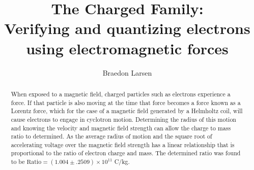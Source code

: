 \documentclass[rc]{physicsinprogress}
\begin{document}
\title{The Charged Family:\\Verifying and quantizing electrons using electromagnetic forces}%

\author{Braedon Larsen}
%


\begin{abstract}
When exposed to a magnetic field, charged particles such as electrons experience a force. If that particle is also moving at the time that force becomes a force known as a Lorentz force, which for the case of a magnetic field generated by a Helmholtz coil, will cause electrons to engage in cyclotron motion. Determining the radius of this motion and knowing the velocity and magnetic field strength can allow the charge to mass ratio to determined. As the average radius of motion and the square root of accelerating voltage over the magnetic field strength has a linear relationship that is proportional to the ratio of electron charge and mass. The determined ratio was found to be $\text{Ratio} = ( 1.004 \pm .2509 )\times 10^{11}$ C/kg.
\end{abstract}
\end{document}
